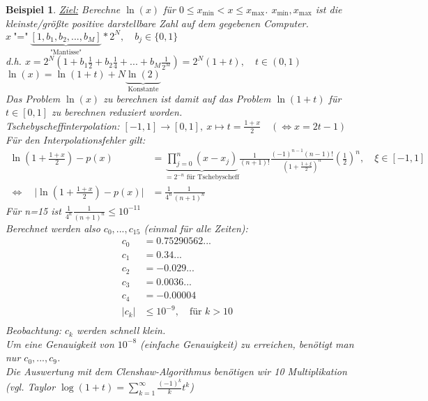 \documentclass[12pt]{article}
\theoremstyle{break}
\newtheorem{example}[theorem]{Beispiel}
\begin{document}
\begin{example}
\underline{Ziel:} Berechne $\ln(x)$ für $0 \leq x_{\min} < x \leq x_{\max}$. $x_{\min}, x_{\max}$ ist die kleinste/größte positive darstellbare Zahl auf dem gegebenen Computer. \\
$x \medspace \text{"="} \medspace \underbrace{\left[ 1, b_1, b_2, ..., b_M \right]}_{\text{"Mantisse"}} * 2^N, \quad b_j \in \{0,1\}$\\
d.h. $ x = 2^N (1+ b_1 \frac{1}{2} + b_2 \frac{1}{4} + ... + b_M \frac{1}{2^M}) = 2^N (1+t), \quad t \in (0,1)$ \\
$\ln(x) = \ln(1+t) + N \underbrace{\ln(2)}_{\text{Konstante}}$ \\
Das Problem $\ln(x)$ zu berechnen ist damit auf das Problem $\ln(1+t)$ für $t \in [0,1]$ zu berechnen reduziert worden. \\
Tschebyscheffinterpolation: $[-1, 1] \rightarrow [0,1], \medspace x \mapsto t = \frac{1+x}{2} \quad (\Leftrightarrow x=2t-1)$ \\
Für den Interpolationsfehler gilt:
\begin{align*}
\ln(1+ \frac{1+x}{2}) -p(x) &= \underbrace{\prod_{j=0}^n (x-x_j)}_{=2^{-n} \text{ für Tschebyscheff}} \frac{1}{(n+1)!} \frac{(-1)^{n-1} (n-1)!}{(1+\frac{1+\xi}{2})^n} \left(\frac{1}{2}\right)^n, \quad \xi \in [-1, 1] &\\
\Leftrightarrow \quad \vert \ln(1+ \frac{1+x}{2}) -p(x) \vert &= \frac{1}{4^n} \frac{1}{(n+1)^n}
\end{align*}
Für n=15 ist $\frac{1}{4^n} \frac{1}{(n+1)^n} \leq 10^{-11}$ \\
Berechnet werden also $c_0,..., c_{15}$ (einmal für alle Zeiten):
\begin{align*}
c_0 &= 0.75290562... &\\
c_1 &= 0.34... &\\
c_2 &= -0.029... &\\
c_3 &= 0.0036... &\\
c_4 &= -0.00004 &\\
\vert c_k \vert &\leq 10^{-9}, \quad \text{für }k >10 &\\
\end{align*}
Beobachtung: $c_k$ werden schnell klein.\\
Um eine Genauigkeit von $10^{-8}$ (einfache Genauigkeit) zu erreichen, benötigt man nur $c_0,..., c_9$.\\
Die Auswertung mit dem Clenshaw-Algorithmus benötigen wir 10 Multiplikation (vgl. Taylor $\log(1+t) = \sum_{k=1}^{\infty} \frac{(-1)^k}{k}t^k$)
\end{example}
\end{document}

